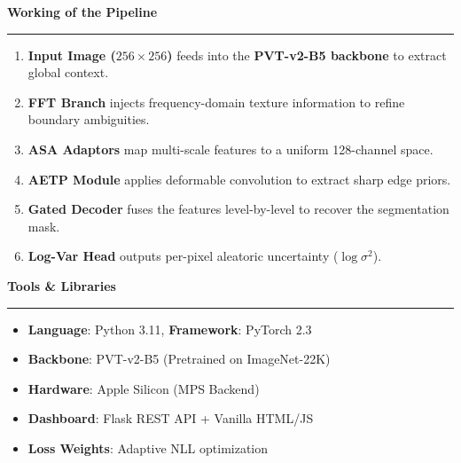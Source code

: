 \documentclass[12pt, landscape]{article}
\begin{document}
\begin{minipage}[t]{0.45\textwidth}
    {\large\bfseries\color{myteal} Working of the Pipeline} \\[0.1cm]
    \textcolor{gray!50}{\rule{\textwidth}{0.8pt}}
    
    \begin{enumerate}[label=\textcolor{myorange}{\arabic*.}, leftmargin=*, nosep, itemsep=6pt]
        \item \textbf{Input Image ($256 \times 256$)} feeds into the \textbf{PVT-v2-B5 backbone} to extract global context.
        \item \textbf{FFT Branch} injects frequency-domain texture information to refine boundary ambiguities.
        \item \textbf{ASA Adaptors} map multi-scale features to a uniform 128-channel space.
        \item \textbf{AETP Module} applies deformable convolution to extract sharp edge priors.
        \item \textbf{Gated Decoder} fuses the features level-by-level to recover the segmentation mask.
        \item \textbf{Log-Var Head} outputs per-pixel aleatoric uncertainty ($\log \sigma^2$).
    \end{enumerate}

    \vspace{0.8cm}

    {\large\bfseries\color{myteal} Tools \& Libraries} \\[0.1cm]
    \textcolor{gray!50}{\rule{\textwidth}{0.8pt}}
    \begin{itemize}[label=\textcolor{myorange}{\tiny$\blacksquare$}, leftmargin=*, nosep, itemsep=4pt]
        \item \textbf{Language}: Python 3.11, \textbf{Framework}: PyTorch 2.3
        \item \textbf{Backbone}: PVT-v2-B5 (Pretrained on ImageNet-22K)
        \item \textbf{Hardware}: Apple Silicon (MPS Backend)
        \item \textbf{Dashboard}: Flask REST API + Vanilla HTML/JS
        \item \textbf{Loss Weights}: Adaptive NLL optimization
    \end{itemize}
\end{minipage}
\end{document}
